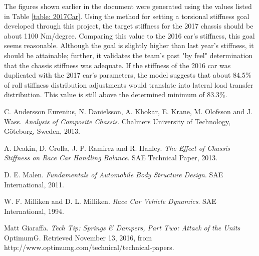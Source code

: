 \documentclass[a4paper]{article}
\numberwithin{equation}{section}
\begin{document}
The figures shown earlier in the document were generated using the values listed in Table \ref{table: 2017Car}. Using the method for setting a torsional stiffness goal developed through this project, the target stiffness for the 2017 chassis should be about 1100 Nm/degree. Comparing this value to the 2016 car's stiffness, this goal seems reasonable. Although the goal is slightly higher than last year's stiffness, it should be attainable; further, it validates the team's past "by feel" determination that the chassis stiffness was adequate. If the stiffness of the 2016 car was duplicated with the 2017 car's parameters, the model suggests that about 84.5\% of roll stiffness distribution adjustments would translate into lateral load transfer distribution. This value is still above the determined minimum of 83.3\%.

\newpage
\begin{thebibliography}{9}
	C. Andersson Eurenius, N. Danielsson, A. Khokar, E. Krane, M. Olofsson and J. Wass.
	\textit{Analysis of Composite Chassis}.
	Chalmers University of Technology, Göteborg, Sweden, 2013.
	
	A. Deakin, D. Crolla, J. P. Ramirez and R. Hanley.
	\textit{The Effect of Chassis Stiffness on Race Car Handling Balance}.
	SAE Technical Paper, 2013.
	
	D. E. Malen.
	\textit{Fundamentals of Automobile Body Structure Design}.
	SAE International, 2011. 
	
	W. F. Milliken and D. L. Milliken.
	\textit{Race Car Vehicle Dynamics}.
	SAE International, 1994. 
	
	Matt Giaraffa.
	\textit{Tech Tip: Springs \& Dampers, Part Two: Attack of the Units}
	OptimumG. Retrieved November 13, 2016, from http://www.optimumg.com/technical/technical-papers.
	\label{References}
\end{thebibliography}

\newpage
\begin{appendices}
	
	
\end{appendices}
\end{document}
